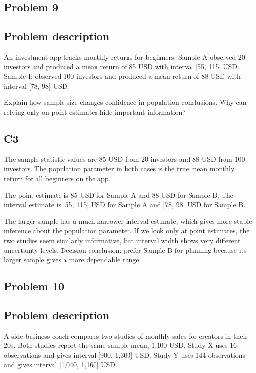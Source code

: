 \begin{ExamProblems}
		\newpage
		\item
		\subsection*{Problem 9}
		\subsection*{Problem description}
		An investment app tracks monthly returns for beginners.
		Sample A observed 20 investors and produced a mean return of 85 USD with interval [55, 115] USD.
		Sample B observed 100 investors and produced a mean return of 88 USD with interval [78, 98] USD.

		Explain how sample size changes confidence in population conclusions.
		Why can relying only on point estimates hide important information?

		\subsection*{C3}
		The sample statistic values are 85 USD from 20 investors and 88 USD from 100 investors.
		The population parameter in both cases is the true mean monthly return for all beginners on the app.

		The point estimate is 85 USD for Sample A and 88 USD for Sample B.
		The interval estimate is [55, 115] USD for Sample A and [78, 98] USD for Sample B.

		The larger sample has a much narrower interval estimate, which gives more stable inference about the population parameter.
		If we look only at point estimates, the two studies seem similarly informative, but interval width shows very different uncertainty levels.
		Decision conclusion: prefer Sample B for planning because its larger sample gives a more dependable range.

		\newpage
		\item
		\subsection*{Problem 10}
		\subsection*{Problem description}
		A side-business coach compares two studies of monthly sales for creators in their 20s.
		Both studies report the same sample mean, 1,100 USD.
		Study X uses 16 observations and gives interval [900, 1,300] USD.
		Study Y uses 144 observations and gives interval [1,040, 1,160] USD.


\end{ExamProblems}
